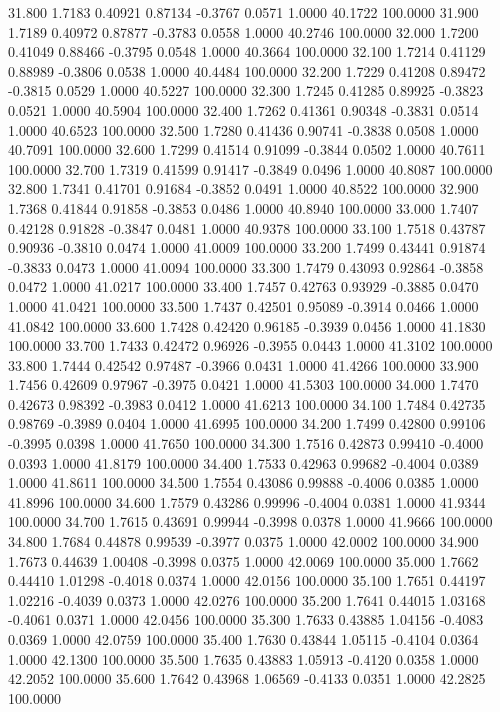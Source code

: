   31.800   1.7183   0.40921   0.87134  -0.3767   0.0571   1.0000  40.1722 100.0000
  31.900   1.7189   0.40972   0.87877  -0.3783   0.0558   1.0000  40.2746 100.0000
  32.000   1.7200   0.41049   0.88466  -0.3795   0.0548   1.0000  40.3664 100.0000
  32.100   1.7214   0.41129   0.88989  -0.3806   0.0538   1.0000  40.4484 100.0000
  32.200   1.7229   0.41208   0.89472  -0.3815   0.0529   1.0000  40.5227 100.0000
  32.300   1.7245   0.41285   0.89925  -0.3823   0.0521   1.0000  40.5904 100.0000
  32.400   1.7262   0.41361   0.90348  -0.3831   0.0514   1.0000  40.6523 100.0000
  32.500   1.7280   0.41436   0.90741  -0.3838   0.0508   1.0000  40.7091 100.0000
  32.600   1.7299   0.41514   0.91099  -0.3844   0.0502   1.0000  40.7611 100.0000
  32.700   1.7319   0.41599   0.91417  -0.3849   0.0496   1.0000  40.8087 100.0000
  32.800   1.7341   0.41701   0.91684  -0.3852   0.0491   1.0000  40.8522 100.0000
  32.900   1.7368   0.41844   0.91858  -0.3853   0.0486   1.0000  40.8940 100.0000
  33.000   1.7407   0.42128   0.91828  -0.3847   0.0481   1.0000  40.9378 100.0000
  33.100   1.7518   0.43787   0.90936  -0.3810   0.0474   1.0000  41.0009 100.0000
  33.200   1.7499   0.43441   0.91874  -0.3833   0.0473   1.0000  41.0094 100.0000
  33.300   1.7479   0.43093   0.92864  -0.3858   0.0472   1.0000  41.0217 100.0000
  33.400   1.7457   0.42763   0.93929  -0.3885   0.0470   1.0000  41.0421 100.0000
  33.500   1.7437   0.42501   0.95089  -0.3914   0.0466   1.0000  41.0842 100.0000
  33.600   1.7428   0.42420   0.96185  -0.3939   0.0456   1.0000  41.1830 100.0000
  33.700   1.7433   0.42472   0.96926  -0.3955   0.0443   1.0000  41.3102 100.0000
  33.800   1.7444   0.42542   0.97487  -0.3966   0.0431   1.0000  41.4266 100.0000
  33.900   1.7456   0.42609   0.97967  -0.3975   0.0421   1.0000  41.5303 100.0000
  34.000   1.7470   0.42673   0.98392  -0.3983   0.0412   1.0000  41.6213 100.0000
  34.100   1.7484   0.42735   0.98769  -0.3989   0.0404   1.0000  41.6995 100.0000
  34.200   1.7499   0.42800   0.99106  -0.3995   0.0398   1.0000  41.7650 100.0000
  34.300   1.7516   0.42873   0.99410  -0.4000   0.0393   1.0000  41.8179 100.0000
  34.400   1.7533   0.42963   0.99682  -0.4004   0.0389   1.0000  41.8611 100.0000
  34.500   1.7554   0.43086   0.99888  -0.4006   0.0385   1.0000  41.8996 100.0000
  34.600   1.7579   0.43286   0.99996  -0.4004   0.0381   1.0000  41.9344 100.0000
  34.700   1.7615   0.43691   0.99944  -0.3998   0.0378   1.0000  41.9666 100.0000
  34.800   1.7684   0.44878   0.99539  -0.3977   0.0375   1.0000  42.0002 100.0000
  34.900   1.7673   0.44639   1.00408  -0.3998   0.0375   1.0000  42.0069 100.0000
  35.000   1.7662   0.44410   1.01298  -0.4018   0.0374   1.0000  42.0156 100.0000
  35.100   1.7651   0.44197   1.02216  -0.4039   0.0373   1.0000  42.0276 100.0000
  35.200   1.7641   0.44015   1.03168  -0.4061   0.0371   1.0000  42.0456 100.0000
  35.300   1.7633   0.43885   1.04156  -0.4083   0.0369   1.0000  42.0759 100.0000
  35.400   1.7630   0.43844   1.05115  -0.4104   0.0364   1.0000  42.1300 100.0000
  35.500   1.7635   0.43883   1.05913  -0.4120   0.0358   1.0000  42.2052 100.0000
  35.600   1.7642   0.43968   1.06569  -0.4133   0.0351   1.0000  42.2825 100.0000
